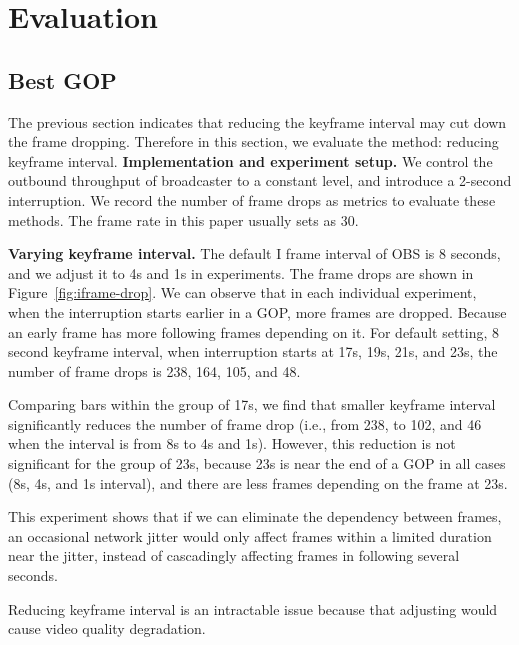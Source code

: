 \section{Evaluation}
\vspace{-0.05in}  
\subsection{Best GOP}
The previous section indicates that reducing the keyframe interval may cut down the frame dropping. Therefore in this section, we evaluate the method: reducing keyframe interval.
\textbf{Implementation and experiment setup.}
We control the outbound throughput of broadcaster to a constant level, and introduce a 2-second interruption. We record the number of frame drops as metrics to evaluate these methods. The frame rate in this paper usually sets as 30.


\textbf{Varying keyframe interval.} The default I frame interval of OBS is 8 seconds, and we adjust it to 4s and 1s in experiments. The frame drops are shown in Figure~\ref{fig:iframe-drop}. We can observe that in each individual experiment, when the interruption starts earlier in a GOP, more frames are dropped. Because an early frame has more following frames depending on it. For default setting, 8 second keyframe interval, when interruption starts at 17s, 19s, 21s, and 23s, the number of frame drops is 238, 164, 105, and 48.
\iffalse
Also, the number of frame drop appears to have the same period with the keyframe interval (e.g., when keyframe interval is 4s, the number of frame drops is 102, 47, 103, and 48 when interruption starts at 17s, 19s, 21s, and 23s, demonstrating a period of 4s.).
\fi
Comparing bars within the group of 17s, we find that smaller keyframe interval significantly reduces the number of frame drop (i.e., from 238, to 102, and 46 when the interval is from 8s to 4s and 1s). However, this reduction is not significant for the group of 23s, because 23s is near the end of a GOP in all cases (8s, 4s, and 1s interval), and there are less frames depending on the frame at 23s.

This experiment shows that if we can eliminate the dependency between frames, an occasional network jitter would only affect frames within a limited duration near the jitter, instead of cascadingly affecting frames in following several seconds. 

Reducing keyframe interval is an intractable issue because that adjusting would cause video quality degradation.

